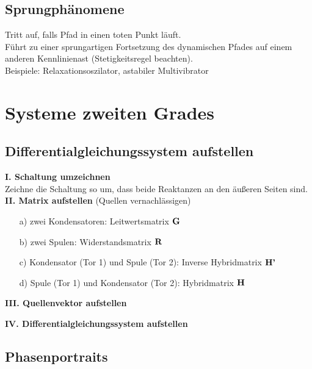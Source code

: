\documentclass[fs, footer]{latex4ei}
\begin{document}
\begin{multicols*}{4}
    \subsection{Sprungphänomene}
    Tritt auf, falls Pfad in einen toten Punkt läuft.\\
    Führt zu einer sprungartigen Fortsetzung des dynamischen Pfades auf einem anderen Kennlinienast (Stetigkeitsregel beachten).\\
    Beispiele: Relaxationsoszilator, astabiler Multivibrator


    \section{Systeme zweiten Grades}
    \subsection{Differentialgleichungssystem aufstellen}
    \textbf{I. Schaltung umzeichnen}\\
    Zeichne die Schaltung so um, dass beide Reaktanzen an den äußeren Seiten sind.\\
    \textbf{II. Matrix aufstellen}
    (Quellen vernachlässigen)
    \begin{itemize}
        \item[a)] zwei Kondensatoren: Leitwertsmatrix $\textbf{G}$
        \item[b)] zwei Spulen: Widerstandsmatrix $\textbf{R}$
        \item[c)] Kondensator (Tor 1) und Spule (Tor 2): Inverse Hybridmatrix $\textbf{H'}$
        \item[d)] Spule (Tor 1) und Kondensator (Tor 2): Hybridmatrix $\textbf{H}$
    \end{itemize}

    \textbf{III. Quellenvektor aufstellen}

    \textbf{IV. Differentialgleichungssystem aufstellen}
    \subsection{Phasenportraits}

\end{multicols*}
\end{document}

